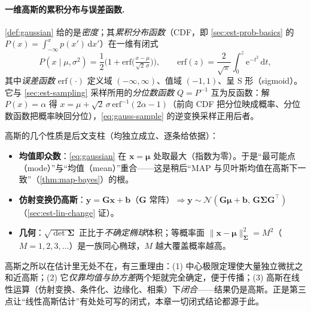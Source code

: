 \paragraph{一维高斯的累积分布与误差函数.}
\cref{def:gaussian} 给的是\emph{密度}；其\emph{累积分布函数}（CDF，即 \cref{sec:est-prob-basics} 的 $P(x)=\int_{-\infty}^{x}p(x')\,\mathrm{d}x'$）在一维有闭式
\begin{equation}
  P(x\mid\mu,\sigma^2)=\frac12\Big(1+\mathrm{erf}\big(\tfrac{x-\mu}{\sqrt{2}\,\sigma}\big)\Big),\qquad
  \mathrm{erf}(z)=\frac{2}{\sqrt{\pi}}\int_{0}^{z}\mathrm{e}^{-t^2}\,\mathrm{d}t,
  \label{eq:gauss-cdf}
\end{equation}
其中\emph{误差函数} $\mathrm{erf}(\cdot)$ 定义域 $(-\infty,\infty)$、值域 $(-1,1)$、呈 S 形（sigmoid）。它与 \cref{sec:est-sampling} 采样所用的\emph{分位数函数} $Q=P^{-1}$ 互为反函数：解 $P(x)=\alpha$ 得 $x=\mu+\sqrt{2}\,\sigma\,\mathrm{erf}^{-1}(2\alpha-1)$（前向 CDF 把分位映成概率、分位数函数把概率映回分位），\cref{eq:gauss-sample} 的逆变换采样正用后者。

\noindent 高斯的几个性质是后文支柱（均独立成立、逐条给依据）：
\begin{itemize}
  \item \textbf{均值即众数}：\cref{eq:gaussian} 在 $\mathbf{x}=\boldsymbol{\mu}$ 处取最大（指数为零）。于是“最可能点（mode）”与“均值（mean）”重合——这是稍后“MAP 与贝叶斯均值在高斯下一致”（\cref{thm:map-bayes}）的根。
  \item \textbf{仿射变换仍高斯}：$\mathbf{y}=\mathbf{G}\mathbf{x}+\mathbf{b}$（$\mathbf{G}$ 常阵）$\Rightarrow\mathbf{y}\sim\mathcal{N}(\mathbf{G}\boldsymbol{\mu}+\mathbf{b},\,\mathbf{G}\boldsymbol{\Sigma}\mathbf{G}^\top)$（\cref{sec:est-lin-change} 证）。
  \item \textbf{几何}：$\sqrt{\det\boldsymbol{\Sigma}}$ 正比于\emph{不确定椭球}体积；等概率面 $\|\mathbf{x}-\boldsymbol{\mu}\|_{\boldsymbol{\Sigma}}^2=M^2$（$M=1,2,3,\dots$）是一族同心椭球，$M$ 越大覆盖概率越高。
\end{itemize}

\begin{insight}
高斯之所以在估计里无处不在，有三重理由：(1) 中心极限定理使大量独立微扰之和近高斯；(2) 它\emph{仅靠均值与协方差}两个矩就完全确定，便于传播；(3) 高斯在线性运算（仿射变换、条件化、边缘化、相乘）下\emph{闭合}——结果仍是高斯。正是第三点让“线性高斯估计”有处处可写的闭式，本章一切闭式结论都源于此。
\end{insight}

